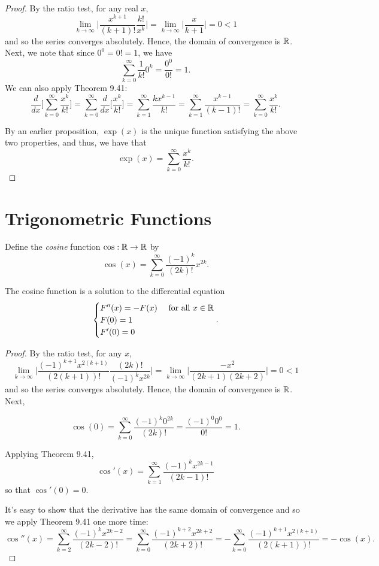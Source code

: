 \documentclass[letterpaper, twoside, 12pt]{book}
\begin{document}
\begin{proof}
    By the ratio test, for any real \(x\),
    \[ \lim_{k \to \infty} \bigg| \frac{x^{k+1}}{(k+1)!} \frac{k!}{x^k} \bigg| = 
       \lim_{k \to \infty} \bigg| \frac{x}{k+1} \bigg| = 0 < 1\]
    and so the series converges absolutely. Hence, the
    domain of convergence is \(\mathbb R\). Next, we note that since \(0^0 = 0! = 1\), we have
    \[ \sum_{k=0}^{\infty} \frac{1}{k!} 0^k = \frac{0^0}{0!} = 1 .\]
    We can also apply Theorem 9.41:
    \[ \frac{d}{dx}\bigg[\sum_{k=0}^{\infty} \frac{x^k}{k!} \bigg] = 
        \sum_{k=0}^{\infty} \frac{d}{dx}\bigg[ \frac{x^k}{k!} \bigg] =
        \sum_{k=1}^{\infty} \frac{k x^{k-1}}{k!} = \sum_{k=1}^{\infty} \frac{x^{k-1}}{(k-1)!} = 
        \sum_{k=0}^{\infty} \frac{x^k}{k!}. \]

    By an earlier proposition, \(\exp(x)\) is the unique function
    satisfying the above two properties, and thus, we have that
    \[ \exp(x) = \sum_{k=0}^{\infty} \frac{x^k}{k!} .\]
\end{proof}

\section{Trigonometric Functions}

\begin{definition}
  Define the \textit{cosine} function \(\cos:\mathbb R\to\mathbb R\) by
  \[
    \cos(x)
      =
    \sum_{k=0}^\infty
    \frac{(-1)^k}{(2k)!}x^{2k}
  .\]
\end{definition}

\begin{theorem}[9.42]
  The cosine function is a solution to the differential equation
  \[
    \begin{cases}
      F''(x)=-F(x) & \text{ for all } x\in \mathbb R \\
      F(0)=1 \\
      F'(0)=0
    \end{cases}
  .\]
\end{theorem}

\begin{proof}
    By the ratio test, for any \(x\),
    \[ \lim_{k \to \infty} \bigg| \frac{(-1)^{k+1}x^{2(k+1)}}{(2(k+1))!} \frac{(2k)!}{(-1)^k x^{2k}} \bigg| =
    \lim_{k \to \infty} \bigg| \frac{-x^2}{(2k + 1)(2k + 2)} \bigg| = 0 < 1 \]
    and so the series converges absolutely. Hence, the domain of convergence 
    is \(\mathbb R\). Next,

    \[ \cos(0) = \sum_{k=0}^{\infty} \frac{(-1)^k 0^{2k}}{(2k)!} = 
    \frac{(-1)^0 0^0}{0!} = 1 .\]

    Applying Theorem 9.41,
    \[ \cos'(x) = \sum_{k=1}^{\infty} \frac{(-1)^k x^{2k - 1}}{(2k - 1)!} \]
    so that \(\cos'(0) = 0\).
    
    It's easy to show that the derivative has the same domain of convergence and
    so we apply Theorem 9.41 one more time:
    \[ \cos''(x) = \sum_{k=2}^{\infty} \frac{(-1)^k x^{2k - 2}}{(2k - 2)!} = 
    \sum_{k = 0}^{\infty} \frac{(-1)^{k + 2} x^{2k + 2}}{(2k + 2)!} = 
- \sum_{k = 0}^{\infty} \frac{(-1)^{k + 1} x^{2(k + 1)}}{(2(k+1))!} = -\cos(x).\]

\end{proof}
\end{document}

